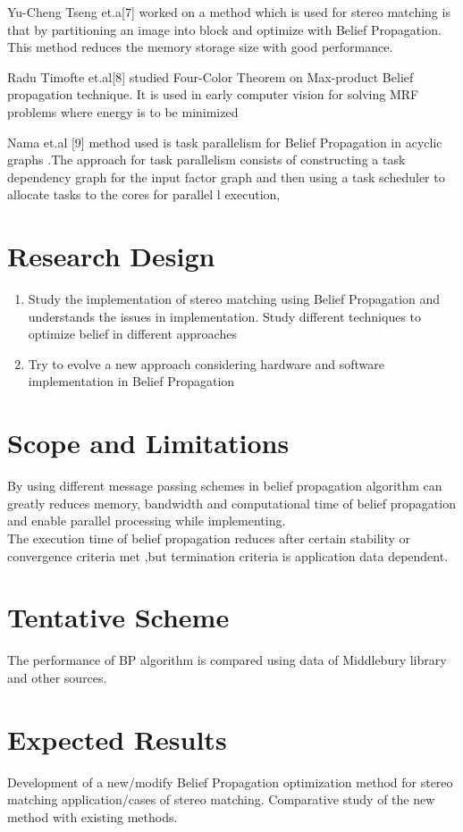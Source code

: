 Yu-Cheng Tseng et.a[7]  worked on  a method which is  used  for stereo matching is that by partitioning an image into block and optimize with Belief Propagation. This method reduces the memory storage size with good performance.





Radu  Timofte et.al[8] studied Four-Color Theorem  on Max-product Belief propagation technique. It is used in early computer vision for solving MRF problems where energy is to be minimized

Nama et.al [9]  method used is task parallelism for Belief Propagation in acyclic graphs .The approach for task parallelism consists of constructing a task dependency graph for the input factor graph and then using a task scheduler to allocate tasks to the cores for parallel l execution,


\section{\textbf{Research Design}}

\begin{enumerate}
\item Study the implementation of stereo matching using Belief Propagation and understands the issues in implementation. Study different techniques to optimize belief in different approaches
\item  Try to evolve a new approach considering hardware and software implementation in Belief Propagation
\end{enumerate}
\section{\textbf{Scope and Limitations}} By using different message passing schemes in belief propagation algorithm can greatly reduces memory, bandwidth and computational time of belief propagation and enable parallel processing while implementing.\\
The execution time of belief propagation reduces after certain stability or convergence criteria met ,but termination criteria is application data dependent.
\section{\textbf{Tentative Scheme }}The performance of BP algorithm is compared  using data of  Middlebury library and other sources.
\section{Expected Results} Development of a new/modify Belief Propagation optimization method for stereo matching application/cases of stereo matching. Comparative study of the new method with existing methods.
